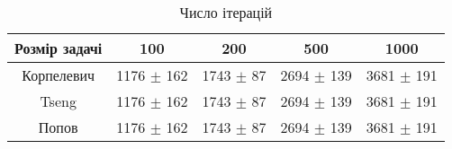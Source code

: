 \begin{table}[H]
	\centering
	\begin{tabular}{|c||c|c|c|c|}\hline
		Розмір задачі & 100 & 200 & 500 & 1000 \\ \hline \hline
		Корпелевич & 1176 $\pm$ 162 & 1743 $\pm$ 87 & 2694 $\pm$ 139 & 3681 $\pm$ 191 \\ \hline
		Tseng & 1176 $\pm$ 162 & 1743 $\pm$ 87 & 2694 $\pm$ 139 & 3681 $\pm$ 191 \\ \hline
		Попов & 1176 $\pm$ 162 & 1743 $\pm$ 87 & 2694 $\pm$ 139 & 3681 $\pm$ 191 \\ \hline
	\end{tabular}
	\caption{Число ітерацій}
\end{table}

